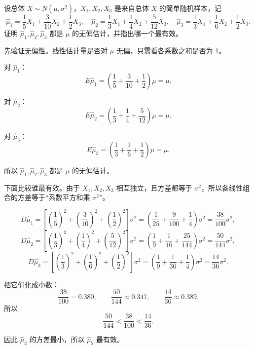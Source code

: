 ﻿\documentclass[lang=cn,11pt]{elegantbook}
\begin{document}
\begin{exercise}\label{exer:7-efficiency}
设总体 \(X \sim N(\mu, \sigma^2)\)，\(X_1, X_2, X_3\) 是来自总体 \(X\) 的简单随机样本，记
\[
\hat{\mu}_1 = \frac{1}{5}X_1 + \frac{3}{10}X_2 + \frac{1}{2}X_3,\quad
\hat{\mu}_2 = \frac{1}{3}X_1 + \frac{1}{4}X_2 + \frac{5}{12}X_3,\quad
\hat{\mu}_3 = \frac{1}{3}X_1 + \frac{1}{6}X_2 + \frac{1}{2}X_3.
\]
证明 \(\hat{\mu}_1, \hat{\mu}_2, \hat{\mu}_3\) 都是 \(\mu\) 的无偏估计，并指出哪一个最有效。
\end{exercise}

\begin{solution}
先验证无偏性。线性估计量是否对 \(\mu\) 无偏，只需看各系数之和是否为 1。

对 \(\hat{\mu}_1\)：
\[
E\hat{\mu}_1
=\left(\frac15+\frac{3}{10}+\frac12\right)\mu
=\mu.
\]

对 \(\hat{\mu}_2\)：
\[
E\hat{\mu}_2
=\left(\frac13+\frac14+\frac{5}{12}\right)\mu
=\mu.
\]

对 \(\hat{\mu}_3\)：
\[
E\hat{\mu}_3
=\left(\frac13+\frac16+\frac12\right)\mu
=\mu.
\]

所以 \(\hat{\mu}_1,\hat{\mu}_2,\hat{\mu}_3\) 都是 \(\mu\) 的无偏估计。

下面比较谁最有效。由于 \(X_1,X_2,X_3\) 相互独立，且方差都等于 \(\sigma^2\)，所以各线性组合的方差等于“系数平方和乘 \(\sigma^2\)”。

\[
D\hat{\mu}_1
=\left[\left(\frac15\right)^2+\left(\frac{3}{10}\right)^2+\left(\frac12\right)^2\right]\sigma^2
=\left(\frac{1}{25}+\frac{9}{100}+\frac{1}{4}\right)\sigma^2
=\frac{38}{100}\sigma^2,
\]
\[
D\hat{\mu}_2
=\left[\left(\frac13\right)^2+\left(\frac14\right)^2+\left(\frac{5}{12}\right)^2\right]\sigma^2
=\left(\frac{1}{9}+\frac{1}{16}+\frac{25}{144}\right)\sigma^2
=\frac{50}{144}\sigma^2,
\]
\[
D\hat{\mu}_3
=\left[\left(\frac13\right)^2+\left(\frac16\right)^2+\left(\frac12\right)^2\right]\sigma^2
=\left(\frac{1}{9}+\frac{1}{36}+\frac{1}{4}\right)\sigma^2
=\frac{14}{36}\sigma^2.
\]

把它们化成小数：
\[
\frac{38}{100}=0.380,\qquad
\frac{50}{144}\approx 0.347,\qquad
\frac{14}{36}\approx 0.389.
\]
所以
\[
\frac{50}{144}<\frac{38}{100}<\frac{14}{36}.
\]

因此 \(\hat{\mu}_2\) 的方差最小，所以 \(\hat{\mu}_2\) 最有效。
\end{solution}
\end{document}
